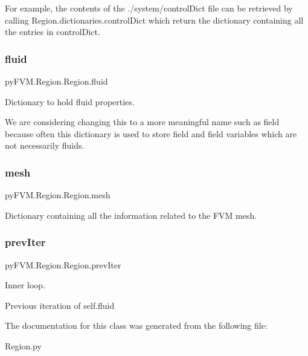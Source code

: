For example, the contents of the \textquotesingle{}./system/control\+Dict\textquotesingle{} file can be retrieved by calling Region.\+dictionaries.\+control\+Dict which return the dictionary containing all the entries in control\+Dict. \mbox{\label{classpy_f_v_m_1_1_region_1_1_region_a18bfc9b2d9c9bd6403db21b5b458a7ac}} 
\subsubsection{\texorpdfstring{fluid}{fluid}}
{\footnotesize\ttfamily py\+F\+V\+M.\+Region.\+Region.\+fluid}



Dictionary to hold \textquotesingle{}fluid\textquotesingle{} properties. 

We are considering changing this to a more meaningful name such as \textquotesingle{}field\textquotesingle{} because often this dictionary is used to store field and field variables which are not necessarily fluids. \mbox{\label{classpy_f_v_m_1_1_region_1_1_region_a2a569d069162a54de1c13f2ba72ce2df}} 
\subsubsection{\texorpdfstring{mesh}{mesh}}
{\footnotesize\ttfamily py\+F\+V\+M.\+Region.\+Region.\+mesh}



Dictionary containing all the information related to the F\+VM mesh. 

\mbox{\label{classpy_f_v_m_1_1_region_1_1_region_aab4dd6e5ae822364b6035fd27e44678a}} 
\subsubsection{\texorpdfstring{prevIter}{prevIter}}
{\footnotesize\ttfamily py\+F\+V\+M.\+Region.\+Region.\+prev\+Iter}



Inner loop. 

Previous iteration of self.\+fluid 

The documentation for this class was generated from the following file\+:\begin{DoxyCompactItemize}
\item 
Region.\+py\end{DoxyCompactItemize}
